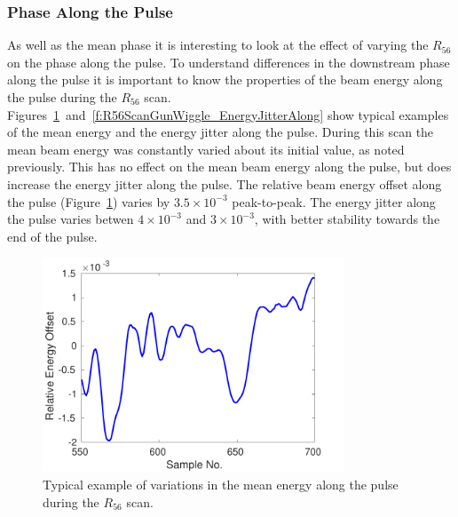 \subsubsection{Phase Along the Pulse}

As well as the mean phase it is interesting to look at the effect of varying the \(R_{56}\) on the phase along the pulse. To understand differences in the downstream phase along the pulse it is important to know the properties of the beam energy along the pulse during the \(R_{56}\) scan. Figures~\ref{f:R56ScanGunWiggle_MeanEnergyAlong}~and~\ref{f:R56ScanGunWiggle_EnergyJitterAlong} show typical examples of the mean energy and the energy jitter along the pulse. During this scan the mean beam energy was constantly varied about its initial value, as noted previously. This has no effect on the mean beam energy along the pulse, but does increase the energy jitter along the pulse. The relative beam energy offset along the pulse (Figure~\ref{f:R56ScanGunWiggle_MeanEnergyAlong}) varies by \(3.5\times10^{-3}\) peak-to-peak. The energy jitter along the pulse varies betwen \(4\times10^{-3}\) and \(3\times10^{-3}\), with better stability towards the end of the pulse.

\begin{figure}
  \centering
  \includegraphics[width=0.8\textwidth]{Figures/propagation/R56ScanGunWiggle_MeanEnergyAlong}
  \caption{Typical example of variations in the mean energy along the pulse during the \(R_{56}\) scan.}
  \label{f:R56ScanGunWiggle_MeanEnergyAlong}
\end{figure}

